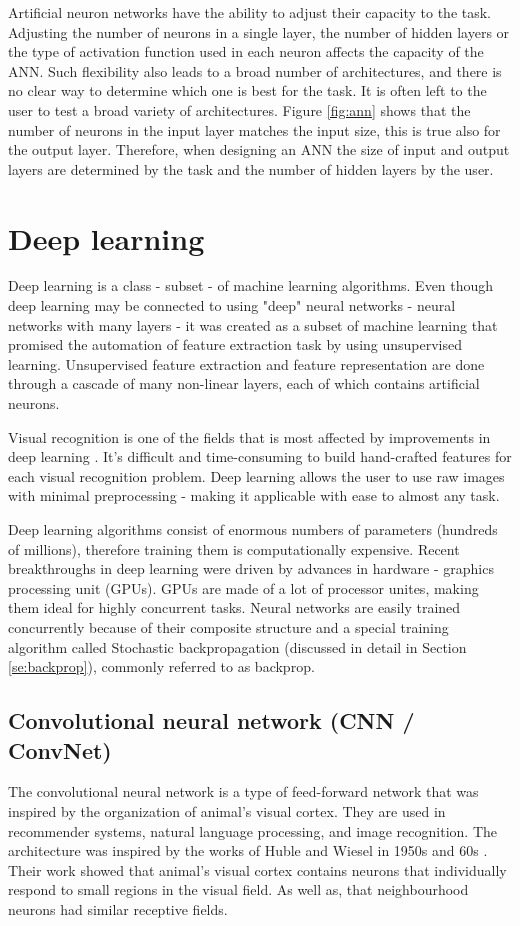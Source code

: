 \documentclass[times, utf8, diplomski]{fer}
\begin{document}
Artificial neuron networks have the ability to adjust their capacity to the task. Adjusting the number of neurons in a single layer, the number of hidden layers or the type of activation function used in each neuron affects the capacity of the ANN. Such flexibility also leads to a broad number of architectures, and there is no clear way to determine which one is best for the task. It is often left to the user to test a broad variety of architectures. Figure \ref{fig:ann} shows that the number of neurons in the input layer matches the input size, this is true also for the output layer. Therefore, when designing an ANN the size of input and output layers are determined by the task and the number of hidden layers by the user.


\section{Deep learning}
\label{se:deep_learning}
Deep learning is a class - subset - of machine learning algorithms. Even though deep learning may be connected to using "deep" neural networks - neural networks with many layers - it was created as a subset of machine learning that promised the automation of feature extraction task by using unsupervised learning. Unsupervised feature extraction and feature representation are done through a cascade of many non-linear layers, each of which contains artificial neurons. 

Visual recognition is one of the fields that is most affected by improvements in deep learning \citep{krizhevsky_imagenet_2012, simonyan_very_2014, szegedy_going_2015, he_deep_2016}. It's difficult and time-consuming to build hand-crafted features for each visual recognition problem. Deep learning allows the user to use raw images with minimal preprocessing - making it applicable with ease to almost any task.

Deep learning algorithms consist of enormous numbers of parameters (hundreds of millions), therefore training them is computationally expensive. Recent breakthroughs in deep learning were driven by advances in hardware - graphics processing unit (GPUs). GPUs are made of a lot of processor unites, making them ideal for highly concurrent tasks. Neural networks are easily trained concurrently because of their composite structure and a special training algorithm called Stochastic backpropagation (discussed in detail in Section \ref{se:backprop}), commonly referred to as backprop.

\subsection{Convolutional neural network (CNN /  ConvNet)}
The convolutional neural network is a type of feed-forward network that was inspired by the organization of animal's visual cortex. They are used in recommender systems, natural language processing, and image recognition. The architecture was inspired by the works of Huble and Wiesel in 1950s and 60s \citep{hubel_receptive_1968}. Their work showed that animal's visual cortex contains neurons that individually respond to small regions in the visual field. As well as,  that neighbourhood neurons had similar receptive fields.
\end{document}
